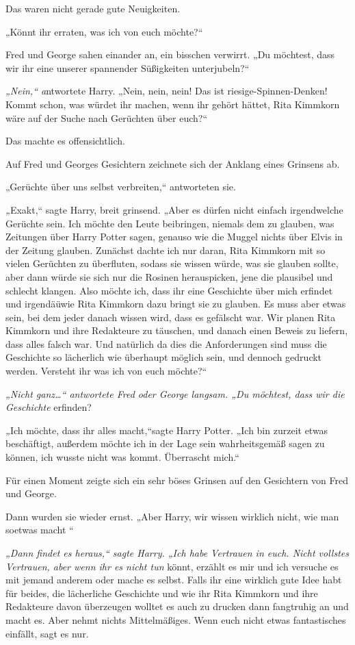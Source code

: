 {Das waren nicht gerade gute Neuigkeiten.

„Könnt ihr erraten, was ich von euch möchte?“

Fred und George sahen einander an, ein bisschen verwirrt. „Du möchtest, dass wir ihr eine unserer spannender Süßigkeiten unterjubeln?“

\emph{„Nein,“ a}ntwortete Harry. „Nein, nein, nein! Das ist riesige-Spinnen-Denken! Kommt schon, was würdet ihr machen, wenn ihr gehört hättet, Rita Kimmkorn wäre auf der Suche nach Gerüchten über euch?“

Das machte es offensichtlich.

Auf Fred und Georges Gesichtern zeichnete sich der Anklang eines Grinsens ab.

„Gerüchte über uns selbst verbreiten,“ antworteten sie.

\emph{„}Exakt,“ sagte Harry, breit grinsend. „Aber es dürfen nicht einfach irgendwelche Gerüchte sein. Ich möchte den Leute beibringen, niemals dem zu glauben, was Zeitungen über Harry Potter sagen, genauso wie die Muggel nichts über Elvis in der Zeitung glauben. Zunächst dachte ich nur daran, Rita Kimmkorn mit so vielen Gerüchten zu überfluten, sodass sie wissen würde, was sie glauben sollte, aber dann würde sie sich nur die Rosinen herauspicken, jene die plausibel und schlecht klangen. Also möchte ich, dass ihr eine Geschichte über mich erfindet und irgendäüwie Rita Kimmkorn dazu bringt sie zu glauben. Es muss aber etwas sein, bei dem jeder danach wissen wird, dass es gefälscht war. Wir planen Rita Kimmkorn und ihre Redakteure zu täuschen, und danach einen Beweis zu liefern, dass alles falsch war. Und natürlich \later da dies die Anforderungen sind \later muss die Geschichte so lächerlich wie überhaupt möglich sein, und dennoch gedruckt werden. Versteht ihr was ich von euch möchte?“

\emph{„Nicht ganz…“ antwortete Fred oder George langsam. „Du möchtest, dass wir die Geschichte} erfinden?

\emph{„}Ich möchte, dass ihr alles macht,“sagte Harry Potter. „Ich bin zurzeit etwas beschäftigt, außerdem möchte ich in der Lage sein wahrheitsgemäß sagen zu können, ich wusste nicht was kommt. Überrascht mich.“

Für einen Moment zeigte sich ein sehr böses Grinsen auf den Gesichtern von Fred und George.

Dann wurden sie wieder ernst. „Aber Harry, wir wissen wirklich nicht, wie man soetwas macht \later“

\emph{„Dann findet es heraus,“ sagte Harry. „Ich habe Vertrauen in euch. Nicht vollstes Vertrauen, aber wenn ihr es nicht tun} könnt, erzählt es mir und ich versuche es mit jemand anderem oder mache es selbst. Falls ihr eine wirklich gute Idee habt \later für beides, die lächerliche Geschichte und wie ihr Rita Kimmkorn und ihre Redakteure davon überzeugen wolltet es auch zu drucken \later dann fangtruhig an und macht es. Aber nehmt nichts Mittelmäßiges. Wenn euch nicht etwas fantastisches einfällt, sagt es nur.

}
